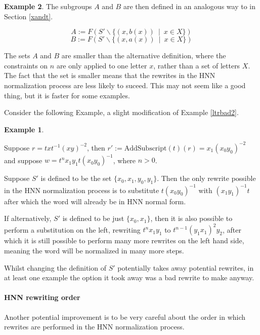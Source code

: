 \documentclass[12pt]{article} %
\theoremstyle{definition}
\theoremstyle{definition}
\theoremstyle{definition}
\theoremstyle{definition}
\theoremstyle{definition}
\theoremstyle{definition}
\newtheorem{exmpl}{Example}[theorem]
\begin{document}
\begin{exmpl}
The subgroups $A$ and $B$ are then defined in an analogous way to in Section \ref{xandt}.

\begin{equation}
  A := F(S' \backslash \{(x, b (x)) \ \mid\  x \in X\})
\end{equation}
\begin{equation}
  B := F(S' \backslash \{(x, a (x)) \ \mid\  x \in X\})
\end{equation}

The sets $A$ and $B$ are smaller than the alternative definition, where the constraints
on $n$ are only applied to one letter $x$, rather than a set of letters $X$. The fact
that the set is smaller means that the rewrites in the HNN normalization process
are less likely to suceed. This may not seem like a good thing, but it is faster for
some examples.

Consider the following Example, a slight modification of Example \ref{ltrbad2}.

\begin{exmpl}\label{ltrbad3}

    Suppose $r = txt^{-1}(xy)^{-2}$,
    then $r' := \text{AddSubscript}(t)(r) = {x_1}(x_0y_0)^{-2}$ and
    suppose $w = t^n x_1y_1 t (x_0y_0)^{-1}$, where $n > 0$.

    Suppose $S'$ is defined to be the set $\{x_0, x_1, y_0, y_1\}$.
    Then the only rewrite possible in the HNN normalization
    process is to substitute $t(x_0y_0)^{-1}$ with
    $(x_1y_1)^{-1}t$ after which the word will already be in HNN
    normal form.

    If alternatively, $S'$ is defined to be just $\{x_0, x_1\}$,
    then it is also possible to perform a substitution on the left,
    rewriting $t^nx_1y_1$ to $t^{n-1}(y_1x_1)^2y_2$, after which it
    is still possible to perform many more rewrites on the left hand side,
    meaning the word will be normalized in many more steps.
\end{exmpl}

Whilst changing the definition of $S'$ potentially takes away potential
rewrites, in at least one example the option it took away was a bad
rewrite to make anyway.

\paragraph{HNN rewriting order}

Another potential improvement is to be very careful about the order in which rewrites
are performed in the HNN normalization process.


\end{exmpl}
\end{document}
